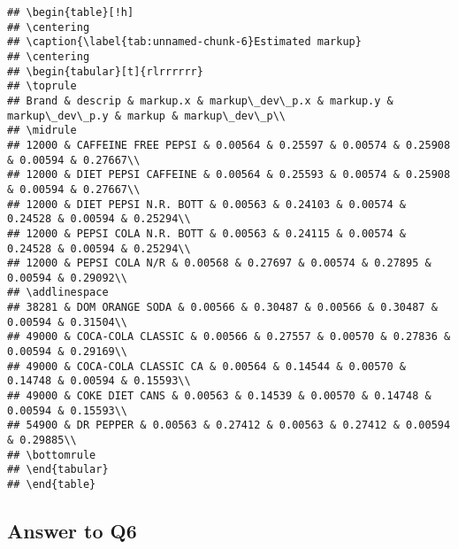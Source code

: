 \documentclass[
]{article}
\begin{document}
\begin{verbatim}
## \begin{table}[!h]
## \centering
## \caption{\label{tab:unnamed-chunk-6}Estimated markup}
## \centering
## \begin{tabular}[t]{rlrrrrrr}
## \toprule
## Brand & descrip & markup.x & markup\_dev\_p.x & markup.y & markup\_dev\_p.y & markup & markup\_dev\_p\\
## \midrule
## 12000 & CAFFEINE FREE PEPSI & 0.00564 & 0.25597 & 0.00574 & 0.25908 & 0.00594 & 0.27667\\
## 12000 & DIET PEPSI CAFFEINE & 0.00564 & 0.25593 & 0.00574 & 0.25908 & 0.00594 & 0.27667\\
## 12000 & DIET PEPSI N.R. BOTT & 0.00563 & 0.24103 & 0.00574 & 0.24528 & 0.00594 & 0.25294\\
## 12000 & PEPSI COLA N.R. BOTT & 0.00563 & 0.24115 & 0.00574 & 0.24528 & 0.00594 & 0.25294\\
## 12000 & PEPSI COLA N/R & 0.00568 & 0.27697 & 0.00574 & 0.27895 & 0.00594 & 0.29092\\
## \addlinespace
## 38281 & DOM ORANGE SODA & 0.00566 & 0.30487 & 0.00566 & 0.30487 & 0.00594 & 0.31504\\
## 49000 & COCA-COLA CLASSIC & 0.00566 & 0.27557 & 0.00570 & 0.27836 & 0.00594 & 0.29169\\
## 49000 & COCA-COLA CLASSIC CA & 0.00564 & 0.14544 & 0.00570 & 0.14748 & 0.00594 & 0.15593\\
## 49000 & COKE DIET CANS & 0.00563 & 0.14539 & 0.00570 & 0.14748 & 0.00594 & 0.15593\\
## 54900 & DR PEPPER & 0.00563 & 0.27412 & 0.00563 & 0.27412 & 0.00594 & 0.29885\\
## \bottomrule
## \end{tabular}
## \end{table}
\end{verbatim}

\hypertarget{answer-to-q6}{%
\subsection{Answer to Q6}\label{answer-to-q6}}
\end{document}
